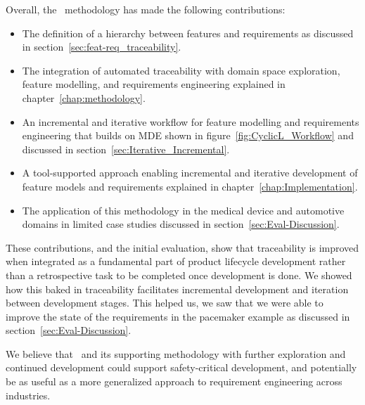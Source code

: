 Overall, the \tool\ methodology has made the following contributions:

\begin{itemize}
	\item The definition of a hierarchy between features and requirements as discussed in section~\ref{sec:feat-req_traceability}.
	\item The integration of automated traceability with domain space exploration, feature modelling, and requirements engineering explained in chapter~\ref{chap:methodology}.
	\item An incremental and iterative workflow for feature modelling and requirements engineering that builds on \gls{MDE} shown in figure~\ref{fig:CyclicL_Workflow} and discussed in section~\ref{sec:Iterative_Incremental}.
	\item A tool-supported approach enabling incremental and iterative development of feature models and requirements explained in chapter~\ref{chap:Implementation}.
	\item The application of this methodology in the medical device and automotive domains in limited case studies discussed in section~\ref{sec:Eval-Discussion}.
\end{itemize}

These contributions, and the initial evaluation, show that traceability is improved when integrated as a fundamental part of product lifecycle development rather than a retrospective task to be completed once development is done. We showed how this baked in traceability facilitates incremental development and iteration between development stages. This helped us, we saw that we were able to improve the state of the requirements in the pacemaker example as discussed in section~\ref{sec:Eval-Discussion}.  

We believe that \tool\ and its supporting methodology with further exploration and continued development could support safety-critical development, and potentially be as useful as a more generalized approach to requirement engineering across industries.

